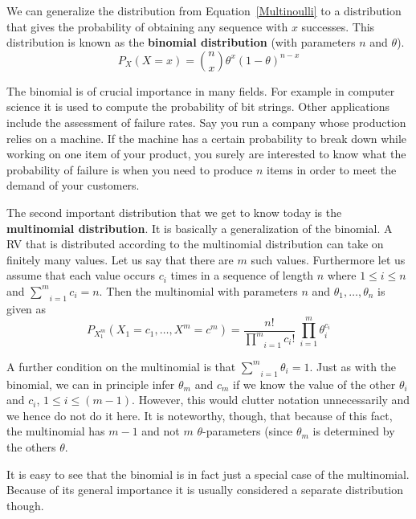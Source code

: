 \documentclass[a4paper,11pt,leqno]{report}
\begin{document}
We can generalize the distribution from Equation~\eqref{Multinoulli} to a distribution that gives the probability of obtaining any sequence
with $ x $ successes. This distribution is known as the \textbf{binomial distribution} (with parameters $ n $ and $ \theta $).
\begin{equation}
P_{X}(X=x) = \binom{n}{x} \theta^{x} (1-\theta)^{n-x}
\end{equation}

The binomial is of crucial importance in many fields. For example in computer science it is used to compute the probability of bit strings.
Other applications include the assessment of failure rates. Say you run a company whose production relies on a machine. If the machine
has a certain probability to break down while working on one item of your product, you surely are interested to know what the probability
of failure is when you need to produce $ n $ items in order to meet the demand of your customers.

The second important distribution that we get to know today is the \textbf{multinomial distribution}. It is basically a generalization
of the binomial. A RV that is distributed according to the multinomial distribution can take on finitely many values. Let us say that
there are $ m $ such values. Furthermore let us assume that each value occurs $ c_{i} $ times in a sequence of length $ n $ where
$ 1 \leq i \leq n $ and $ \underset{i=1}{\overset{m}{\sum}}c_{i} = n $. Then the multinomial with parameters $ n $ and 
$ \theta_{1}, \ldots, \theta_{n} $ is given as 
\begin{equation}
P_{X_{1}^{m}}(X_{1}=c_{1}, \ldots, X^{m}=c^{m}) = \dfrac{n!}{\underset{i=1}{\overset{m}{\prod}}c_{i}!}~\underset{i=1}{\overset{m}{\prod}} \theta_{i}^{c_{i}}
\end{equation}

A further condition on the multinomial is that $ \underset{i=1}{\overset{m}{\sum}}\theta_{i} = 1 $. Just as with the binomial, we can
in principle infer $ \theta_{m} $ and $ c_{m} $ if we know the value of the other $ \theta_{i} $ and $ c_{i} $, $ 1 \leq i \leq (m-1) $. However, this would
clutter notation unnecessarily and we hence do not do it here. It is noteworthy, though, that because of this fact, the multinomial
has $ m-1 $ and not $ m $ $ \theta $-parameters (since $ \theta_{m} $ is determined by the others $ \theta $.

It is easy to see that the binomial is in fact just a special case of the multinomial. Because of its general importance it is usually
considered a separate distribution though.
\end{document}
